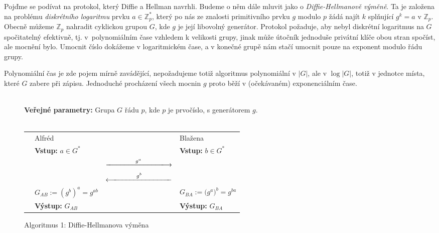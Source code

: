 \documentclass[12pt]{report}
\begin{document}
Pojďme se podívat na protokol, který Diffie a Hellman navrhli. Budeme o něm dále mluvit jako o \textit{Diffie-Hellmanově výměně}. Ta je založena na problému \textit{diskrétního logaritmu} prvku $a \in \mathbb{Z}_p^{*}$, který po nás ze znalosti primitivního prvku $g$ modulo $p$ žádá najít $k$ splňující $g^k = a$ v $\mathbb{Z}_p$. Obecně můžeme $\mathbb{Z}_p$ nahradit cyklickou grupou $G$, kde $g$ je její libovolný generátor. Protokol požaduje, aby nebyl diskrétní logaritmus na $G$ spočitatelný efektivně, tj. v~polynomiálním čase vzhledem k velikosti grupy, jinak může útočník jednoduše privátní klíče obou stran spočíst, ale mocnění bylo. Umocnit číslo dokážeme v logaritmickém čase, a v konečné grupě nám stačí umocnit pouze na exponent modulo řádu grupy.

\begin{poznamka}
Polynomiální čas je zde pojem mírně zavádějící, nepožadujeme totiž algoritmus polynomiální v $\vert G \vert$, ale v $\log \vert G \vert$, totiž v jednotce místa, které $G$ zabere při zápisu. Jednoduché procházení všech mocnin $g$ proto běží v (očekávaném) exponenciálním čase. 
\end{poznamka}

\begin{figure}[h]
\begin{center} 
\makebox[1cm]{\rule{15cm}{0.4pt}}\\
\hspace{-1.35cm} \textbf{Veřejné parametry:} Grupa $G$ řádu $p$, kde $p$ je prvočíslo, s generátorem $g$.\\

\vspace{-0.25cm}
\makebox[\linewidth]{\rule{15cm}{0.4pt}}\\
\vspace{0.2cm}
\begin{tabular}{l l c l}
\cline{2-2} \cline{4-4} 
& Alfréd & & Blažena \\ 
\cline{2-2} \cline{4-4} 
& \textbf{Vstup:} $a \in G^{*}$ & & \textbf{Vstup:} $b \in G^{*}$ \\
 & & $ \xlongrightarrow{\qquad \qquad  g^a \qquad \qquad}$ &  \\
&  & $\xlongleftarrow{\qquad \qquad  g^b \qquad \qquad} $ &  \\
& $G_{AB} := \left(g^b\right)^{a} = g^{ab}$ &  & $ G_{BA} := \big(g^a\big)^{b} = g^{ba}$ \\
& \textbf{Výstup:} $G_{AB}$ & & \textbf{Výstup:} $G_{BA}$
\end{tabular}
\caption*{Algoritmus 1: Diffie-Hellmanova výměna}
\vspace{-0.3cm}
\end{center}
\end{figure}
\end{document}
